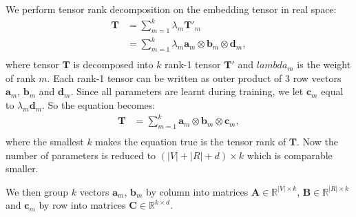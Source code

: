 \documentclass[a4paper]{article}
\begin{document}
We perform tensor rank decomposition \citep{hitchcock1927expression} on the embedding tensor in real space:
\begin{equation} \label{eq:trd_org}
\begin{aligned}
    \mathbf{T}   
        &= \sum_{m=1}^{k} \lambda_m \mathbf{T}'_m \\
        &= \sum_{m=1}^{k} \lambda_m \mathbf{a}_m \otimes \mathbf{b}_m \otimes \mathbf{d}_m, \\
\end{aligned}
\end{equation}
where tensor $\mathbf{T}$ is decomposed into $k$ rank-1 tensor $\mathbf{T}'$ and $lambda_m$ is the weight of rank $m$. Each rank-1 tensor can be written as outer product of 3 row vectors $\mathbf{a}_m$, $\mathbf{b}_m$ and $\mathbf{d}_m$. Since all parameters are learnt during training, we let $\mathbf{c}_m$ equal to $\lambda_m \mathbf{d}_m$. So the equation becomes:
\begin{equation} \label{eq:trd}
\begin{aligned}
    \mathbf{T}   
        &= \sum_{m=1}^{k} \mathbf{a}_m \otimes \mathbf{b}_m \otimes \mathbf{c}_m, \\
\end{aligned}
\end{equation}
where the smallest $k$ makes the equation true is the tensor rank of $\mathbf{T}$. Now the number of parameters is reduced to $(|V| + |R| + d) \times k$ which is comparable smaller. 

We then group $k$ vectors $\mathbf{a}_m$, $\mathbf{b}_m$ by column into matrices $\mathbf{A} \in \mathbb{R}^{|V| \times k}$, $\mathbf{B} \in \mathbb{R}^{|R| \times k}$ and $\mathbf{c}_m$ by row into matrices $\mathbf{C} \in \mathbb{R}^{k \times d}$. 
\end{document}
